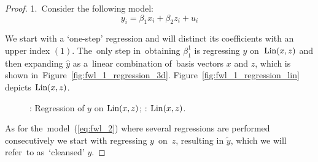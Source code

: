 \begin{proof}
1.~Consider the following model:
\begin{equation} \label{eq:fwl_proof}
y_i = \beta_1 x_i + \beta_2 z_i + u_i
\end{equation}

We start with a `one-step' regression  and will distinct its coefficients with
an upper index $(1)$.
The~only step in~obtaining $\beta_1^{1}$ is regressing $y$ on~$\operatorname{Lin}(x,z)$ and
then expanding $\hat y$ as a~linear combination of~basis vectors $x$ and $z$,
which is shown in~Figure~\ref{fig:fwl_1_regression_3d}. Figure~\ref{fig:fwl_1_regression_lin}
depicts $\operatorname{Lin}(x, z)$.

\begin{figure}[ht!]
\begin{center}
\hspace{4ex}
\caption{: Regression of $y$ on $\operatorname{Lin}(x,z)$;
: $\operatorname{Lin}(x, z)$.}
\end{center}
\end{figure}

As for the~model~(\ref{eq:fwl_2}) where several regressions are performed consecutively
we start with regressing $y$~on~$z$, resulting in $\tilde{y}$,
which we will refer~to as~`cleansed' $y$.


\end{proof}

